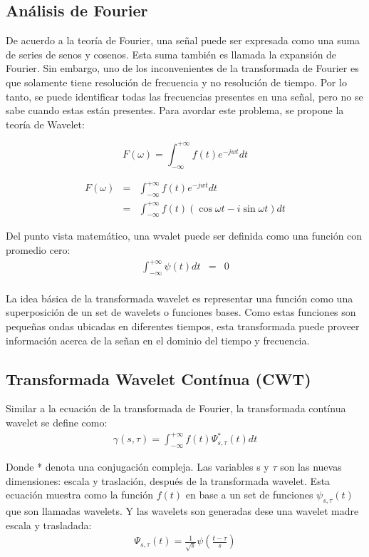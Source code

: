 \subsection{Análisis de Fourier}
De acuerdo a la teoría de Fourier, una señal puede ser expresada como una suma
de series de senos y cosenos. Esta suma también es llamada la expansión de
Fourier. Sin embargo, uno de los inconvenientes de la transformada de Fourier
es que solamente tiene resolución de frecuencia y no resolución de tiempo. Por
lo tanto, se puede identificar todas las frecuencias presentes en una señal,
pero no se sabe cuando estas están presentes. Para avordar este problema, se propone la teoría de Wavelet:

$$
F(\omega) = \int^{+\infty}_{-\infty} f(t)e^{-jwt} dt
$$

\begin{eqnarray*}
	F(\omega)	&=&	\int^{+\infty}_{-\infty} f(t)e^{-jwt}dt \\
				&=&	\int^{+\infty}_{-\infty} f(t)(\cos\omega t - i\sin\omega t)dt
\end{eqnarray*}

Del punto vista matemático, una wvalet puede ser definida como una función con promedio cero:
\begin{eqnarray*}
	\int^{+\infty}_{-\infty} \psi(t)dt &=& 0 \\
\end{eqnarray*}

La idea básica de la transformada wavelet es representar una función como una
superposición de un set de wavelets o funciones bases. Como estas funciones son
pequeñas ondas ubicadas en diferentes tiempos, esta transformada puede proveer
información acerca de la señan en el dominio del tiempo y frecuencia.

\subsection{Transformada Wavelet Contínua (CWT)}
Similar a la ecuación de la transformada de Fourier, la transformada contínua
wavelet se define como:
\begin{eqnarray*}
	\gamma(s,\tau) = \int^{+\infty}_{-\infty}f(t)\Psi^{*}_{s,\tau}(t)dt
\end{eqnarray*}

Donde * denota una conjugación compleja. Las variables s y $\tau$ son las
nuevas dimensiones: escala y traslación, después de la transformada wavelet.
Esta ecuación muestra como la función $f(t)$ en base a un set de funciones
$\psi_{s,\tau}(t)$ que son llamadas wavelets. Y las wavelets son generadas dese
una wavelet madre escala y trasladada:
\begin{eqnarray*}
	\Psi_{s,\tau}(t) = \frac{1}{\sqrt{s}}\psi\left(\frac{t-\tau}{s}\right)
\end{eqnarray*}

